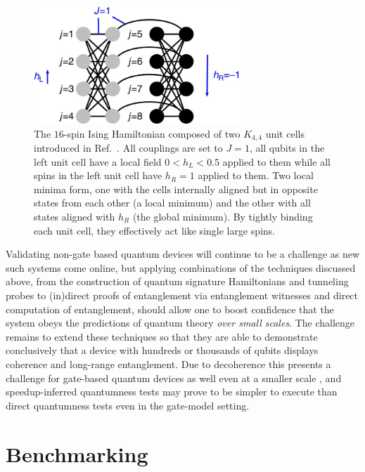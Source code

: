 \begin{figure}[t]
\centering
 \includegraphics[height=1.75in]{chapters/Test-driving/tunnelling_probe}
\caption{The $16$-spin Ising Hamiltonian composed of two $K_{4,4}$ unit cells introduced in Ref.~\cite{Boixo:2014yu}. All couplings are set to $J=1$, all qubits in the left unit cell have a local field $0<h_L<0.5$ applied to them while all spins in the left unit cell have $h_R=1$ applied to them. Two local minima form, one with the cells internally aligned but in opposite states from each other (a local minimum) and the other with all states aligned with $h_R$ (the global minimum). By tightly binding each unit cell, they effectively act like single large spins.}
\label{fig:tunnelingprobe}
\end{figure}

Validating non-gate based quantum devices will continue to be a challenge as new such systems come online, but applying combinations of the techniques discussed above, from the construction of quantum signature Hamiltonians and tunneling probes to (in)direct proofs of entanglement via entanglement witnesses and direct computation of entanglement, should allow one to boost confidence that the system obeys the predictions of quantum theory \emph{over small scales}.
The challenge remains to extend these techniques so that they are able to demonstrate conclusively that a device with hundreds or thousands of qubits displays coherence and long-range entanglement.
Due to decoherence this presents a challenge for gate-based quantum devices as well even at a smaller scale \cite{PhysRevLett.106.130506,Bohnet:2016aa}, and speedup-inferred quantumness tests may prove to be simpler to execute than direct quantumness tests even in the gate-model setting.

\section{Benchmarking}
\label{section:benchmarking}


